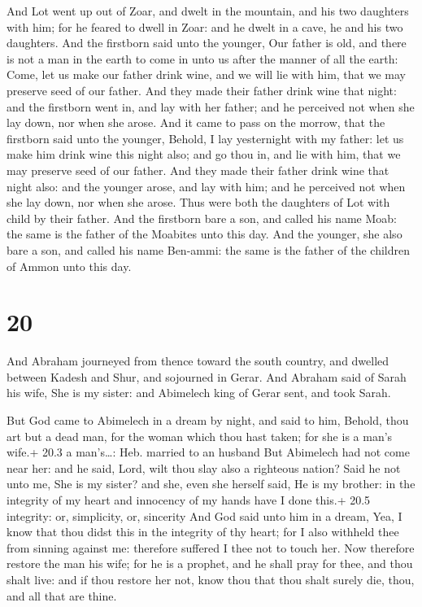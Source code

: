  And Lot went up out of Zoar, and dwelt in the mountain,
and his two daughters with him; for he feared to dwell in Zoar: and he
dwelt in a cave, he and his two daughters.  And the
firstborn said unto the younger, Our father is old, and there is not a
man in the earth to come in unto us after the manner of all the earth:
 Come, let us make our father drink wine, and we will lie
with him, that we may preserve seed of our father.  And
they made their father drink wine that night: and the firstborn went in,
and lay with her father; and he perceived not when she lay down, nor
when she arose.  And it came to pass on the morrow, that
the firstborn said unto the younger, Behold, I lay yesternight with my
father: let us make him drink wine this night also; and go thou in, and
lie with him, that we may preserve seed of our father.  And
they made their father drink wine that night also: and the younger
arose, and lay with him; and he perceived not when she lay down, nor
when she arose.  Thus were both the daughters of Lot with
child by their father.  And the firstborn bare a son, and
called his name Moab: the same is the father of the Moabites unto this
day.  And the younger, she also bare a son, and called his
name Ben-ammi: the same is the father of the children of Ammon unto this
day.

\hypertarget{section-19}{%
\section{20}\label{section-19}}

 And Abraham journeyed from thence toward the south country,
and dwelled between Kadesh and Shur, and sojourned in Gerar.
 And Abraham said of Sarah his wife, She is my sister: and
Abimelech king of Gerar sent, and took Sarah.

 But God came to Abimelech in a dream by night, and said to
him, Behold, thou art but a dead man, for the woman which thou hast
taken; for she is a man's wife.+ 20.3 a man's\ldots: Heb. married to an
husband  But Abimelech had not come near her: and he said,
Lord, wilt thou slay also a righteous nation?  Said he not
unto me, She is my sister? and she, even she herself said, He is my
brother: in the integrity of my heart and innocency of my hands have I
done this.+ 20.5 integrity: or, simplicity, or, sincerity 
And God said unto him in a dream, Yea, I know that thou didst this in
the integrity of thy heart; for I also withheld thee from sinning
against me: therefore suffered I thee not to touch her.  Now
therefore restore the man his wife; for he is a prophet, and he shall
pray for thee, and thou shalt live: and if thou restore her not, know
thou that thou shalt surely die, thou, and all that are thine.

